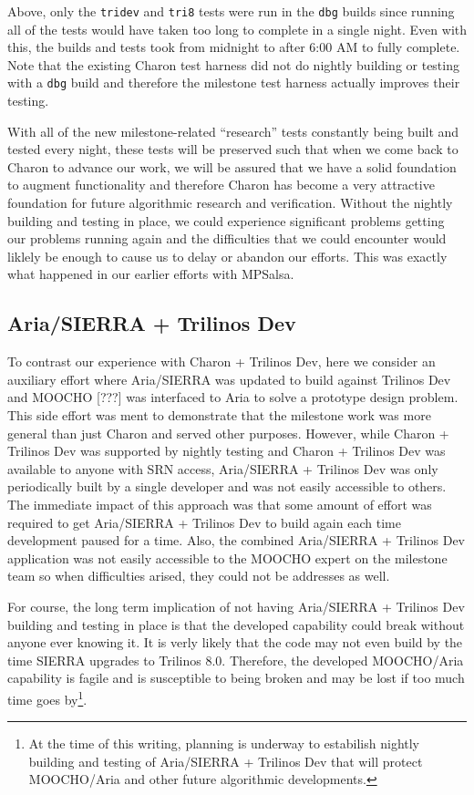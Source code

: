 \documentclass[pdf,ps2pdf,11pt]{SANDreport}
\begin{document}
Above, only the {}\texttt{tridev} and {}\texttt{tri8} tests were run in the
{}\texttt{dbg} builds since running all of the tests would have taken too long
to complete in a single night.  Even with this, the builds and tests took from
midnight to after 6:00 AM to fully complete.  Note that the existing Charon
test harness did not do nightly building or testing with a {}\texttt{dbg}
build and therefore the milestone test harness actually improves their
testing.

With all of the new milestone-related ``research'' tests constantly being
built and tested every night, these tests will be preserved such that when we
come back to Charon to advance our work, we will be assured that we have a
solid foundation to augment functionality and therefore Charon has become a
very attractive foundation for future algorithmic research and verification.
Without the nightly building and testing in place, we could experience
significant problems getting our problems running again and the difficulties
that we could encounter would liklely be enough to cause us to delay or
abandon our efforts.  This was exactly what happened in our earlier efforts
with MPSalsa.


%
\subsection{Aria/SIERRA + Trilinos Dev}
%

To contrast our experience with Charon + Trilinos Dev, here we consider an
auxiliary effort where Aria/SIERRA was updated to build against Trilinos Dev
and MOOCHO [???] was interfaced to Aria to solve a prototype design problem.
This side effort was ment to demonstrate that the milestone work was more
general than just Charon and served other purposes.  However, while Charon +
Trilinos Dev was supported by nightly testing and Charon + Trilinos Dev was
available to anyone with SRN access, Aria/SIERRA + Trilinos Dev was only
periodically built by a single developer and was not easily accessible to
others.  The immediate impact of this approach was that some amount of effort
was required to get Aria/SIERRA + Trilinos Dev to build again each time
development paused for a time.  Also, the combined Aria/SIERRA + Trilinos Dev
application was not easily accessible to the MOOCHO expert on the milestone
team so when difficulties arised, they could not be addresses as well.

For course, the long term implication of not having Aria/SIERRA + Trilinos Dev
building and testing in place is that the developed capability could break
without anyone ever knowing it.  It is verly likely that the code may not even
build by the time SIERRA upgrades to Trilinos 8.0.  Therefore, the developed
MOOCHO/Aria capability is fagile and is susceptible to being broken and may be
lost if too much time goes by\footnote{At the time of this writing, planning
is underway to estabilish nightly building and testing of Aria/SIERRA +
Trilinos Dev that will protect MOOCHO/Aria and other future algorithmic
developments.}.
\end{document}
